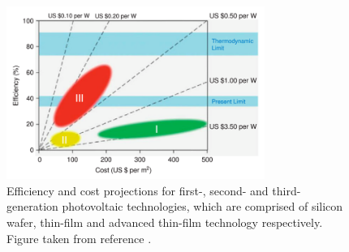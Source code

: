 \begin{figure}[h!]
  \centering
    \includegraphics[width=0.75\textwidth]{figures/PV_generations.png}
    \caption{Efficiency and cost projections for first-, second- and third-generation photovoltaic technologies, which are comprised of silicon wafer, thin-film and advanced thin-film technology respectively. Figure 
 taken from reference .}
  \label{PV_generations}
\end{figure}

